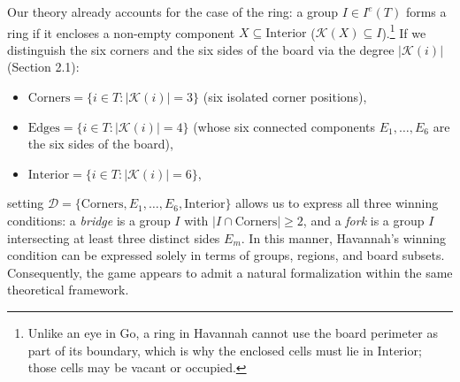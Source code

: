 Our theory already accounts for the case of the ring: a group $I \in I^e(T)$
forms a ring if it encloses a non-empty component $X \subseteq \text{Interior}$
($\mathcal{K}(X) \subseteq I$).\footnote{Unlike an eye in Go, a ring in Havannah
	cannot use the board perimeter as part of its boundary, which is why the
	enclosed cells must lie in $\text{Interior}$; those cells may be vacant or
	occupied.} If we distinguish the six corners and the six sides of the board via
the degree $|\mathcal{K}(i)|$ (Section 2.1):
\begin{itemize}
	\item $\text{Corners} = \{i \in T : |\mathcal{K}(i)| = 3\}$ (six isolated
	corner positions),
	\item $\text{Edges} = \{i \in T : |\mathcal{K}(i)| = 4\}$ (whose six
	connected components $E_1, \dots, E_6$ are the six sides of the board),
	\item $\text{Interior} = \{i \in T : |\mathcal{K}(i)| = 6\}$,
\end{itemize}
setting $\mathcal{D} = \{\text{Corners}, E_1, \dots, E_6, \text{Interior}\}$
allows us to express all three winning conditions: a \emph{bridge} is a group
$I$ with $|I \cap \text{Corners}| \ge 2$, and a \emph{fork} is a group $I$
intersecting at least three distinct sides $E_m$.
In this manner, Havannah's winning condition can be expressed solely in terms of groups, regions, and board subsets. Consequently, the game appears to admit a natural formalization within the same theoretical framework. 

